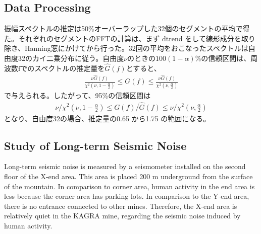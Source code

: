\subsection{Data Processing}
振幅スペクトルの推定は50\%オーバーラップした32個のセグメントの平均で得た。それぞれのセグメントのFFTの計算は、まず dtrend をして線形成分を取り除き、Hanning窓にかけてから行った。32回の平均をおこなったスペクトルは自由度32のカイ二乗分布に従う。自由度$\nu$のときの$100(1-\alpha)$\%の信頼区間は、周波数$\mathrm{f}$でのスペクトルの推定量を$\hat{G}(f)$とすると、
\begin{eqnarray}
  \frac{\nu{\hat{G}(f)}}{\chi^2(\nu,1-\frac{\alpha}{2})} \leq G(f) \leq \frac{\nu{\hat{G}(f)}}{\chi^2(\nu,\frac{\alpha}{2})}
\end{eqnarray}
で与えられる。したがって、95\%の信頼区間は
\begin{eqnarray}
  \nu/\chi^2(\nu,1-\frac{\alpha}{2}) \leq G(f)/\hat{G}(f) \leq \nu/\chi^2(\nu,\frac{\alpha}{2})
\end{eqnarray}
となり、自由度32の場合、推定量の0.65 から1.75 の範囲になる。

\subsection{Study of Long-term Seismic Noise}
Long-term seismic noise is measured by a seismometer installed on the second floor of the X-end area. This area is placed 200 $\mathrm{m}$ underground from the surface of the mountain. In comparison to corner area, human activity in the end area is less because the corner area has parking lots. In comparison to the Y-end area, there is no entrance connected to other mines. Therefore, the X-end area is relatively quiet in the KAGRA mine, regarding the seismic noise induced by human activity. 

